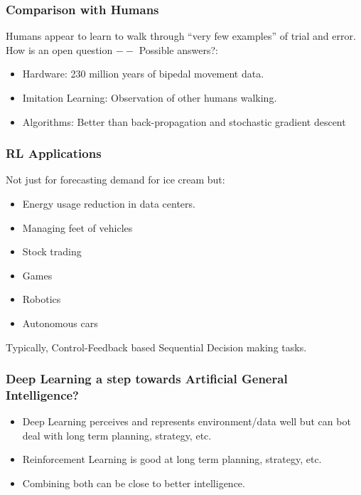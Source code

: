 \begin{frame}[fragile]\frametitle{Comparison with Humans}

Humans appear to learn to walk through ``very few examples'' of trial and error. How is an open question $--$ Possible answers?:
\begin{itemize}
\item Hardware: 230 million years of bipedal movement data.
\item Imitation Learning: Observation of other humans walking.
\item Algorithms: Better than back-propagation and stochastic gradient descent
\end{itemize}


\end{frame}


\begin{frame}[fragile]\frametitle{RL Applications}
 Not just for forecasting demand for ice cream but:
\begin{itemize}
\item Energy usage reduction in data centers.
\item Managing feet of vehicles
\item Stock trading
\item Games
\item Robotics
\item Autonomous cars
\end{itemize}

Typically, Control-Feedback based Sequential Decision making tasks.

\end{frame}


\begin{frame}[fragile]\frametitle{Deep Learning a step towards Artificial General Intelligence?}

\begin{itemize}
\item Deep Learning perceives and represents environment/data well but can bot deal with long term planning, strategy, etc.
\item Reinforcement Learning is good at long term planning, strategy, etc.
\item Combining both can be close to better intelligence. 
\end{itemize}

\end{frame}


